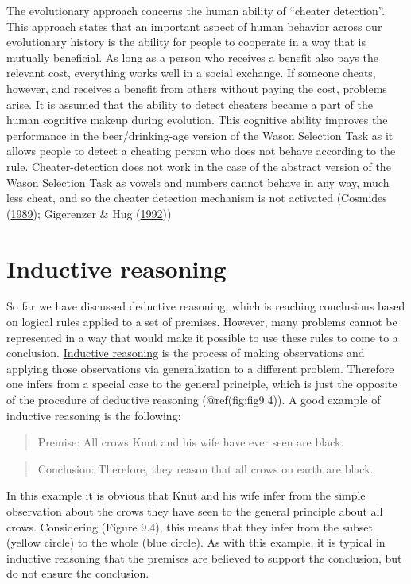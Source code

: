 \documentclass[
]{krantz}
\begin{document}
The evolutionary approach concerns the human ability of ``cheater detection''. This approach states that an important aspect of human behavior across our evolutionary history is the ability for people to cooperate in a way that is mutually beneficial. As long as a person who receives a benefit also pays the relevant cost, everything works well in a social exchange. If someone cheats, however, and receives a benefit from others without paying the cost, problems arise. It is assumed that the ability to detect cheaters became a part of the human cognitive makeup during evolution. This cognitive ability improves the performance in the beer/drinking-age version of the Wason Selection Task as it allows people to detect a cheating person who does not behave according to the rule. Cheater-detection does not work in the case of the abstract version of the Wason Selection Task as vowels and numbers cannot behave in any way, much less cheat, and so the cheater detection mechanism is not activated (Cosmides (\protect\hyperlink{ref-cosmides1989logic}{1989}); Gigerenzer \& Hug (\protect\hyperlink{ref-gigerenzer1992domain}{1992}))

\hypertarget{inductive-reasoning}{%
\section{Inductive reasoning}\label{inductive-reasoning}}

So far we have discussed deductive reasoning, which is reaching conclusions based on logical rules applied to a set of premises. However, many problems cannot be represented in a way that would make it possible to use these rules to come to a conclusion. \protect\hyperlink{inductive-reasoning}{Inductive reasoning} is the process of making observations and applying those observations via generalization to a different problem. Therefore one infers from a special case to the general principle, which is just the opposite of the procedure of deductive reasoning (@ref(fig:fig9.4)). A good example of inductive reasoning is the following:

\begin{quote}
Premise: All crows Knut and his wife have ever seen are black.
\end{quote}

\begin{quote}
Conclusion: Therefore, they reason that all crows on earth are black.
\end{quote}

In this example it is obvious that Knut and his wife infer from the simple observation about the crows they have seen to the general principle about all crows. Considering (Figure 9.4), this means that they infer from the subset (yellow circle) to the whole (blue circle). As with this example, it is typical in inductive reasoning that the premises are believed to support the conclusion, but do not ensure the conclusion.
\end{document}
